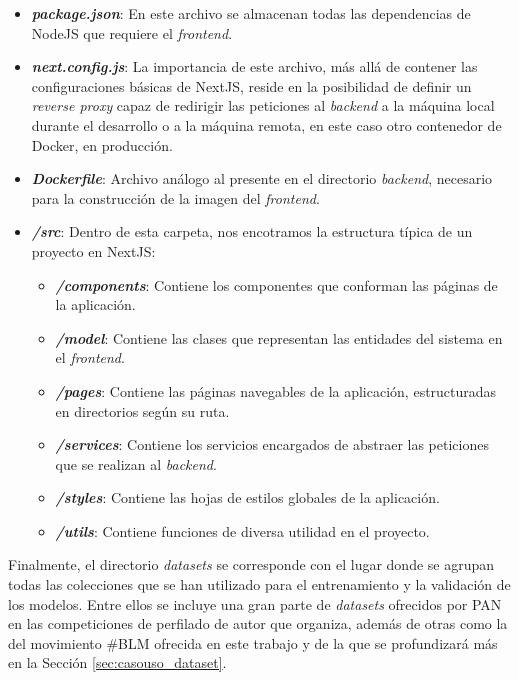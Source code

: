 \begin{itemize}
	\item \textbf{\textit{package.json}}: En este archivo se almacenan todas las dependencias de NodeJS que requiere el \textit{frontend}.
	\item \textbf{\textit{next.config.js}}: La importancia de este archivo, más allá de contener las configuraciones básicas de NextJS, reside en la posibilidad
	      de definir un \textit{reverse proxy} capaz de redirigir las peticiones al \textit{backend} a la máquina local durante el desarrollo o a la máquina remota,
	      en este caso otro contenedor de Docker, en producción.
	\item \textbf{\textit{Dockerfile}}: Archivo análogo al presente en el directorio \textit{backend}, necesario para la construcción de la imagen del \textit{frontend}.
	\item \textbf{\textit{/src}}: Dentro de esta carpeta, nos encotramos la estructura típica de un proyecto en NextJS:
	      \begin{itemize}
		      \item \textbf{\textit{/components}}: Contiene los componentes que conforman las páginas de la aplicación.
		      \item \textbf{\textit{/model}}: Contiene las clases que representan las entidades del sistema en el \textit{frontend}.
		      \item \textbf{\textit{/pages}}: Contiene las páginas navegables de la aplicación, estructuradas en directorios según su ruta.
		      \item \textbf{\textit{/services}}: Contiene los servicios encargados de abstraer las peticiones que se realizan al \textit{backend}.
		      \item \textbf{\textit{/styles}}: Contiene las hojas de estilos globales de la aplicación.
		      \item \textbf{\textit{/utils}}: Contiene funciones de diversa utilidad en el proyecto.
	      \end{itemize}
\end{itemize}

\bigskip
Finalmente, el directorio \textit{datasets} se corresponde con el lugar donde se agrupan todas las colecciones que se han utilizado
para el entrenamiento y la validación de los modelos. Entre ellos se incluye una gran parte de \textit{datasets} ofrecidos por PAN \cite{pan} en las competiciones
de perfilado de autor que organiza, además de otras como la del movimiento \#BLM ofrecida en este trabajo y de la que se profundizará más en la Sección \ref{sec:casouso_dataset}.


